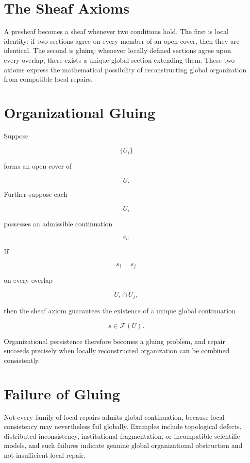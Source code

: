 \documentclass[11pt,oneside]{book}
\numberwithin{equation}{chapter}
\theoremstyle{definition}
\theoremstyle{plain}
\begin{document}
\section{The Sheaf Axioms}

A presheaf becomes a sheaf whenever two conditions hold. The first is local identity: if two sections agree on every member of an open cover, then they are identical. The second is gluing: whenever locally defined sections agree upon every overlap, there exists a unique global section extending them. These two axioms express the mathematical possibility of reconstructing global organization from compatible local repairs.

\section{Organizational Gluing}

Suppose

\[
\{U_i\}
\]

forms an open cover of

\[
U.
\]

Further suppose each

\[
U_i
\]

possesses an admissible continuation

\[
s_i.
\]

If

\[
s_i
=
s_j
\]

on every overlap

\[
U_i
\cap
U_j,
\]

then the sheaf axiom guarantees the existence of a unique global
continuation

\[
s
\in
\mathcal F(U).
\]

Organizational persistence therefore becomes a gluing problem, and repair succeeds precisely when locally reconstructed organization can be combined consistently.

\section{Failure of Gluing}

Not every family of local repairs admits global continuation, because local consistency may nevertheless fail globally. Examples include topological defects, distributed inconsistency, institutional fragmentation, or incompatible scientific models, and such failures indicate genuine global organizational obstruction and not insufficient local repair.
\end{document}

